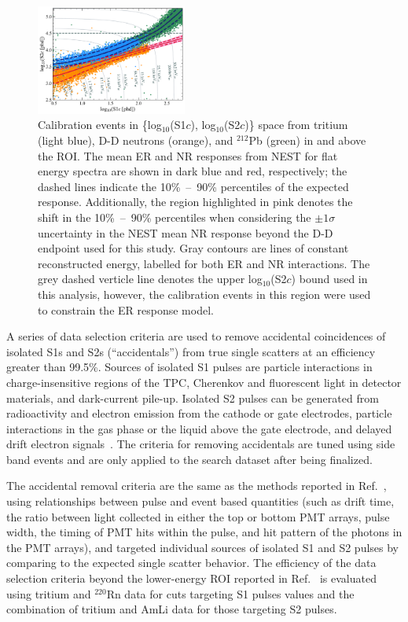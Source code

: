 \documentclass[reprint, showpacs,
preprintnumbers,
amsmath,amssymb,
aps, floatfix,
superscriptaddress,
prd, nofootinbib]{revtex4-1}
\begin{document}
\begin{figure}[ht]
    \centering
    \includegraphics[trim={8 5 5 5},clip, width=0.44\textwidth]{SR1WS_EFT_LogLog}
    \caption{Calibration events in \{log$_{10}$(S1$c$), log$_{10}$(S2$c$)\} space from tritium (light blue), D-D neutrons (orange), and ${}^{212}$Pb (green) in and above the ROI.
    The mean ER and NR responses from NEST for flat energy spectra are shown in dark blue and red, respectively; the dashed lines indicate the 10\%~--~90\% percentiles of the expected response.
    Additionally, the region highlighted in pink denotes the shift in the 10\%~--~90\% percentiles when considering the $\pm1\sigma$ uncertainty in the NEST mean NR response beyond the D-D endpoint used for this study.
    Gray contours are lines of constant reconstructed energy, labelled for both ER and NR interactions. The grey dashed verticle line denotes the upper log$_{10}$(S2$c$) bound used in this analysis, however, the calibration events in this region were used to constrain the ER response model. 
    }
    \label{fig:calibrations}
\end{figure}

\par
A series of data selection criteria are used to remove accidental coincidences of isolated S1s and S2s (``accidentals'') from true single scatters at an efficiency greater than 99.5\%. 
Sources of isolated S1 pulses are particle interactions in charge-insensitive regions of the TPC, Cherenkov and fluorescent light in detector materials, and dark-current pile-up. 
Isolated S2 pulses can be generated from radioactivity and electron emission from the cathode or gate electrodes, particle interactions in the gas phase or the liquid above the gate electrode, and delayed drift electron signals~\cite{LUX:2020vbj}.  
The criteria for removing accidentals are tuned using side band events and are only applied to the search dataset after being finalized. 

The accidental removal criteria are the same as the methods reported in Ref.~\cite{LZ:SR1WS_2022}, using relationships between pulse and event based quantities (such as drift time, the ratio between light collected in either the top or bottom PMT arrays, pulse width, the timing of PMT hits within the pulse, and hit pattern of the photons in the PMT arrays), and targeted individual sources of isolated S1 and S2 pulses by comparing to the expected single scatter behavior.
The efficiency of the data selection criteria beyond the lower-energy ROI reported in Ref.~\cite{LZ:SR1WS_2022} is evaluated using tritium and $^{220}$Rn data for cuts targeting S1 pulses values and the combination of tritium and AmLi data for those targeting S2 pulses. 
\end{document}
